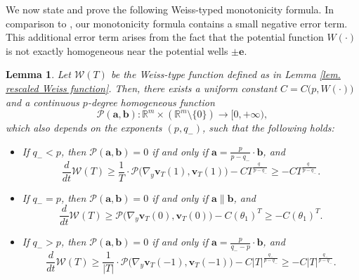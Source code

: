 \documentclass[11pt,twoside,reqno]{amsart}
\newtheorem{lemma}{Lemma}[section]
\numberwithin{equation}{section}
\begin{document}
We now state and prove the following Weiss-typed monotonicity formula. In comparison to \cite{W99}, our monotonicity formula contains a small negative error term. This additional error term arises from
the fact that the potential function $W(\cdot)$ is not exactly homogeneous near
the potential wells $\pm\mathbf{e}$.
\begin{lemma}\label{lem. Weiss Monotonicity}
Let $\mathcal{W}(T)$ be   the Weiss-type function defined as in Lemma \ref{lem. rescaled Weiss function}. Then, there exists a uniform constant $C=C\big(p,W(\cdot)\big)$ and a continuous $p$-degree homogeneous function
\begin{equation*}
    \mathcal{P}(\mathbf{a},\mathbf{b}):\mathbb{R}^{m}\times(\mathbb{R}^{m}\setminus\{0\})\to[0,+\infty),
\end{equation*}
which also depends on the exponents $(p,q_{-})$, such that the following holds:
\begin{itemize}
    \item[(1)] If $q_{-}<p$, then $\mathcal{P}(\mathbf{a},\mathbf{b})=0$ if and only if $\mathbf{a}=\frac{p}{p-q_{-}}\cdot\mathbf{b}$, and
    \begin{equation*}
        \frac{d}{dt} \mathcal{W}(T)\geq\frac{1}{T}\cdot\mathcal{P}\Big(\nabla_{y}\mathbf{v}_{T}(1),\mathbf{v}_{T}(1)\Big)-C T^{\frac{q_-}{p-q_-}}\geq-C T^{\frac{q_-}{p-q_-}}.
    \end{equation*}
    \item[(2)] If $q_{-}=p$, then $\mathcal{P}(\mathbf{a},\mathbf{b})=0$ if and only if $\mathbf{a}\parallel\mathbf{b}$, and
    \begin{equation*}
        \frac{d}{dt} \mathcal{W}(T)\geq\mathcal{P}\Big(\nabla_{y}\mathbf{v}_{T}(0),\mathbf{v}_{T}(0)\Big)-C (\theta_1)^T\geq-C (\theta_1)^T.
    \end{equation*}
    \item[(3)] If $q_{-}>p$, then $\mathcal{P}(\mathbf{a},\mathbf{b})=0$ if and only if $\mathbf{a}=\frac{p}{q_{-}-p}\cdot\mathbf{b}$, and
    \begin{equation*}
        \frac{d}{dt} \mathcal{W}(T)\geq\frac{1}{|T|}\cdot\mathcal{P}\Big(\nabla_{y}\mathbf{v}_{T}(-1),\mathbf{v}_{T}(-1)\Big)-C |T|^{\frac{q_-}{p-q_-}}\geq-C |T|^{\frac{q_-}{p-q_-}}.
    \end{equation*}
\end{itemize}
\end{lemma}
\end{document}
